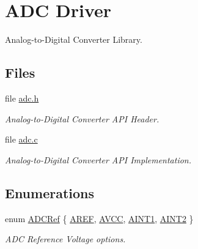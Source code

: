 \hypertarget{group__adc}{\section{A\-D\-C Driver}
\label{group__adc}
}


Analog-\/to-\/\-Digital Converter Library.  


\subsection*{Files}
\begin{DoxyCompactItemize}
\item 
file \hyperlink{adc_8h}{adc.\-h}
\begin{DoxyCompactList}\small\item\em Analog-\/to-\/\-Digital Converter A\-P\-I Header. \end{DoxyCompactList}\item 
file \hyperlink{adc_8c}{adc.\-c}
\begin{DoxyCompactList}\small\item\em Analog-\/to-\/\-Digital Converter A\-P\-I Implementation. \end{DoxyCompactList}\end{DoxyCompactItemize}
\subsection*{Enumerations}
\begin{DoxyCompactItemize}
\item 
enum \hyperlink{group__adc_ga7fc3dc0de11790b4393b4be70d79a02f}{A\-D\-C\-Ref} \{ \hyperlink{group__adc_gga7fc3dc0de11790b4393b4be70d79a02fa6e9ea4c6059ebc1e09b29a64afe26bd4}{A\-R\-E\-F}, 
\hyperlink{group__adc_gga7fc3dc0de11790b4393b4be70d79a02faead1f65bef727ff7542b8139baceae9c}{A\-V\-C\-C}, 
\hyperlink{group__adc_gga7fc3dc0de11790b4393b4be70d79a02fa46f5d50796c7975a87eedbd152f34126}{A\-I\-N\-T1}, 
\hyperlink{group__adc_gga7fc3dc0de11790b4393b4be70d79a02fa265a976440d52609d53c5f8bfe2dae34}{A\-I\-N\-T2}
 \}
\begin{DoxyCompactList}\small\item\em A\-D\-C Reference Voltage options. \end{DoxyCompactList}\end{DoxyCompactItemize}
